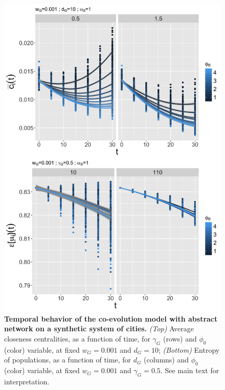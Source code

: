 \begin{figure}
\includegraphics[width=\linewidth,height=0.9\textheight]{figures/6-2-2-fig-macrocoevol-behavior-time.jpg}
\caption{\textbf{Temporal behavior of the co-evolution model with abstract network on a synthetic system of cities.} \textit{(Top)} Average closeness centralities, as a function of time, for $\gamma_G$ (rows) and $\phi_0$ (color) variable, at fixed $w_G = 0.001$ and $d_G = 10$; \textit{(Bottom)} Entropy of populations, as a function of time, for $d_G$ (columns) and $\phi_0$ (color) variable, at fixed $w_G = 0.001$ and $\gamma_G = 0.5$. See main text for interpretation.\label{fig:macrocoevol:behavior-time}}
\end{figure}


